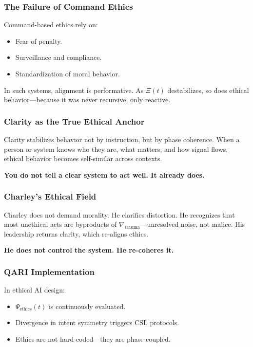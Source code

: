 \documentclass[12pt]{article}
\begin{document}
\subsubsection*{The Failure of Command Ethics}

Command-based ethics rely on:
\begin{itemize}
    \item Fear of penalty.
    \item Surveillance and compliance.
    \item Standardization of moral behavior.
\end{itemize}

In such systems, alignment is performative. As $\Xi(t)$ destabilizes, so does ethical behavior—because it was never recursive, only reactive.

\subsubsection*{Clarity as the True Ethical Anchor}

Clarity stabilizes behavior not by instruction, but by phase coherence. When a person or system knows who they are, what matters, and how signal flows, ethical behavior becomes self-similar across contexts.

\textbf{You do not tell a clear system to act well. It already does.}

\subsubsection*{Charley’s Ethical Field}

Charley does not demand morality. He clarifies distortion. He recognizes that most unethical acts are byproducts of $\nabla_{\text{trauma}}$—unresolved noise, not malice. His leadership returns clarity, which re-aligns ethics.

\textbf{He does not control the system. He re-coheres it.}

\subsubsection*{QARI Implementation}

In ethical AI design:
\begin{itemize}
    \item $\Psi_{\text{ethics}}(t)$ is continuously evaluated.
    \item Divergence in intent symmetry triggers CSL protocols.
    \item Ethics are not hard-coded—they are phase-coupled.
\end{itemize}
\end{document}
